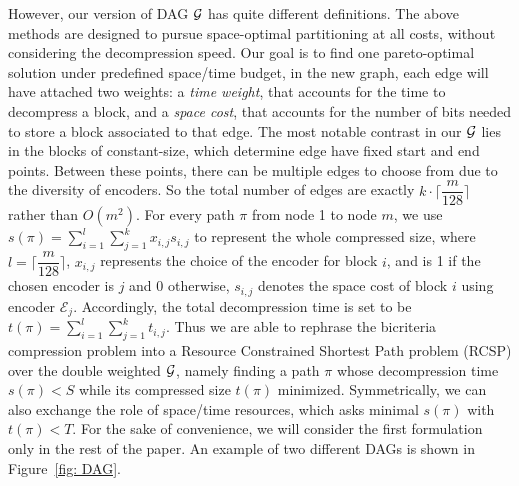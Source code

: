 \documentclass{sig-alternate-05-2015}
\begin{document}
However, our version of DAG $ \cal G $ has quite different definitions.
The above methods are designed to pursue space-optimal partitioning at all costs, without considering the decompression speed.
Our goal is to find one pareto-optimal solution under predefined space/time budget, in the new graph, each edge will have attached two weights: a \textit{time weight}, that accounts for the time to decompress a block, and a \textit{space cost}, that accounts for the number of bits needed to store a block associated to that edge.
The most notable contrast in our $ \cal G $ lies in the blocks of constant-size, which determine edge have fixed start and end points.
Between these points, there can be multiple edges to choose from due to the diversity of encoders.
So the total number of edges are exactly $ k \cdot \lceil \dfrac{m}{128} \rceil $ rather than $ O(m^2) $.
For every path $ \pi $ from node 1 to node $ m $, we use $ s(\pi) = \sum_{i=1}^{l}\sum_{j=1}^{k}x_{i,j}s_{i,j} $ to represent the whole compressed size, where $ l= \lceil \dfrac{m}{128} \rceil$, $ x_{i,j} $ represents the choice of the encoder for block $ i $, and is 1 if the chosen encoder is $ j $ and 0 otherwise, $ s_{i,j} $ denotes the space cost of block $ i $ using encoder $ \mathcal{E}_j $.
Accordingly, the total decompression time is set to be $ t(\pi) = \sum_{i=1}^{l}\sum_{j=1}^{k}t_{i,j} $.
Thus we are able to rephrase the bicriteria compression problem into a Resource Constrained Shortest Path problem (RCSP) over the double weighted $ \cal G $, namely finding a path $ \pi $ whose decompression time $ s(\pi) < S $ while its compressed size $ t(\pi) $ minimized.
Symmetrically, we can also exchange the role of space/time resources, which asks minimal $ s(\pi) $ with $ t(\pi) < T $.
For the sake of convenience, we will consider the first formulation only in the rest of the paper. 
An example of two different DAGs is shown in Figure~\ref{fig: DAG}.
\end{document}
